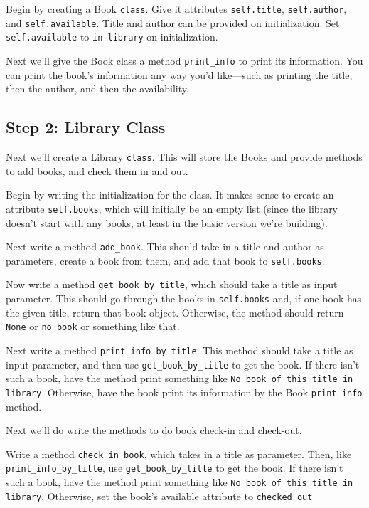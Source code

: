 \documentclass{hitec}
\begin{document}
Begin by creating a Book \texttt{class}. Give it attributes \texttt{self.title}, \texttt{self.author}, and \texttt{self.available}. Title and author can be provided on initialization. Set\\ \texttt{self.available} to \texttt{\textquotesingle in library\textquotesingle} on initialization.

Next we'll give the Book class a method \texttt{print\_info} to print its information. You can print the book's information any way you'd like---such as printing the title, then the author, and then the availability.

\subsection{Step 2: Library Class}
Next we'll create a Library \texttt{class}. This will store the Books and provide methods to add books, and check them in and out.

Begin by writing the initialization for the class. It makes sense to create an attribute \texttt{self.books}, which will initially be an empty list (since the library doesn't start with any books, at least in the basic version we're building).

Next write a method \texttt{add\_book}. This should take in a title and author as parameters, create a book from them, and add that book to \texttt{self.books}.

Now write a method \texttt{get\_book\_by\_title}, which should take a title as input parameter. This should go through the books in \texttt{self.books} and, if one book has the given title, return that book object. Otherwise, the method
should return \texttt{None} or \texttt{\textquotesingle no book\textquotesingle} or something like that.

Next write a method \texttt{print\_info\_by\_title}. This method should take a title as input parameter, and then use \texttt{get\_book\_by\_title} to get the book. If there isn't such a book, have the method print something like \texttt{\textquotesingle No book of this title in library\textquotesingle}. Otherwise, have the book print its information by the Book \texttt{print\_info} method.

Next we'll do write the methods to do book check-in and check-out. 

Write a method \texttt{check\_in\_book}, which takes in a title as parameter. Then, like \texttt{print\_info\_by\_title}, use \texttt{get\_book\_by\_title} to get the book. If there isn't such a book, have the method print something like \texttt{\textquotesingle No book of this title in library\textquotesingle}. Otherwise, set the book's available attribute to \texttt{\textquotesingle checked out\textquotesingle}
\end{document}
